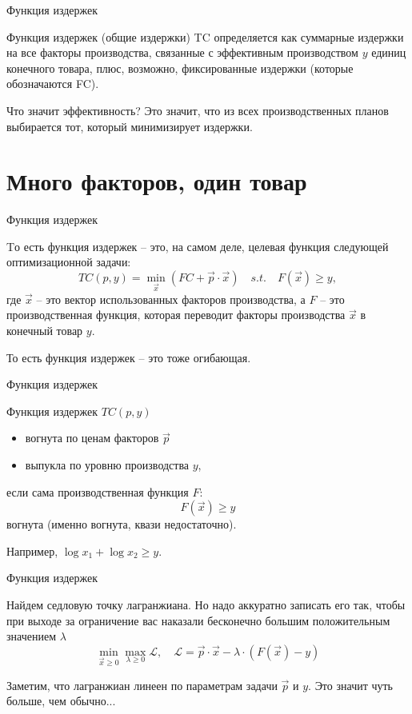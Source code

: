 \documentclass{beamer}
\begin{document}
\begin{frame}{Функция издержек}

\begin{definition}
\alert{Функция издержек} (общие издержки) TC определяется как суммарные издержки на все факторы производства, связанные с эффективным производством $y$ единиц конечного товара, плюс, возможно, фиксированные издержки (которые обозначаются FC).
\end{definition}

Что значит \alert{эффективность}? Это значит, что из всех производственных планов выбирается тот, который минимизирует издержки.
\end{frame}

\section{Много факторов, один товар}

\begin{frame}{Функция издержек}

Tо есть функция издержек – это, на самом деле, целевая функция следующей оптимизационной задачи:
$$ TC(p, y) = \min_{\vec x} ( FC + \vec p \cdot \vec x ) \quad s.t. \quad F(\vec x) \geqslant y,$$
где $\vec x$ – это вектор использованных факторов производства, а $F$ – это \alert{производственная функция}, которая переводит факторы производства $\vec x$ в конечный товар $y$.

То есть функция издержек – это тоже огибающая.

\end{frame}

\begin{frame}{Функция издержек}

\begin{lemma}
\alert{Функция издержек} $TC(p,y)$
\begin{itemize}
\item вогнута по ценам факторов $\vec p$
\item выпукла по уровню производства $y$,
\end{itemize}

если сама производственная функция $F$:
$$
F(\vec x) \geqslant y
$$
вогнута (именно вогнута, квази недостаточно).
\end{lemma}
Например, $\log x_1 + \log x_2 \geqslant y$.
\end{frame}

\begin{frame}{Функция издержек}

Найдем седловую точку лагранжиана. Но надо аккуратно записать его так, чтобы при выходе за ограничение вас наказали бесконечно большим положительным значением $\lambda$
$$ \min_{\vec x \geqslant 0} \max_{\lambda \geqslant 0} \mathcal{L}, \quad \mathcal{L} = \vec p \cdot \vec x - \lambda \cdot (F(\vec x) - y)$$

Заметим, что лагранжиан линеен по параметрам задачи $\vec p$ и $y$. Это значит чуть больше, чем обычно...

\end{frame}
\end{document}

